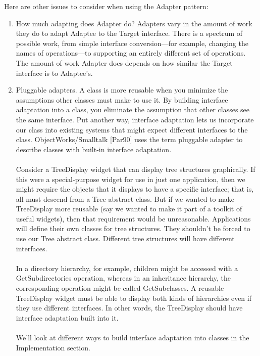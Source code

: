 Here are other issues to consider when using the Adapter pattern:
\begin{enumerate}

    \item How much adapting does Adapter do? Adapters vary in the amount of work they do to adapt Adaptee to the Target interface. There is a spectrum of possible work, from simple interface conversion—for example, changing the names of operations—to supporting an entirely different set of operations. The amount of work Adapter does depends on how similar the Target interface is to Adaptee's.

    \item Pluggable adapters. A class is more reusable when you minimize the assumptions other classes must make to use it. By building interface adaptation into a class, you eliminate the assumption that other classes see the same interface. Put another way, interface adaptation lets us incorporate our class into existing systems that might expect different interfaces to the class. ObjectWorks/Smalltalk [Par90] uses the term pluggable adapter to describe classes with built-in interface adaptation.
    \\\\
    Consider a TreeDisplay widget that can display tree structures graphically. If this were a special-purpose widget for use in just one application, then we might require the objects that it displays to have a specific interface; that is, all must descend from a Tree abstract class. But if we wanted to make TreeDisplay more reusable (say we wanted to make it part of a toolkit of useful widgets), then that requirement would be unreasonable. Applications will define their own classes for tree structures. They shouldn't be forced to use our Tree abstract class. Different tree structures will have different interfaces.
    \\\\
    In a directory hierarchy, for example, children might be accessed with a GetSubdirectories operation, whereas in an inheritance hierarchy, the corresponding operation might be called GetSubclasses. A reusable TreeDisplay widget must be able to display both kinds of hierarchies even if they use different interfaces. In other words, the TreeDisplay should have interface adaptation built into it.
    \\\\
    We'll look at different ways to build interface adaptation into classes in the Implementation section.


\end{enumerate}
